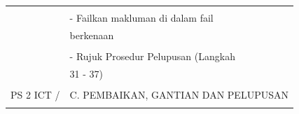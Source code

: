 \documentclass[
]{article}
\begin{document}
\begin{longtable}[]{@{}ll@{}}
\begin{minipage}[t]{0.71\columnwidth}
\strut
\end{minipage}\tabularnewline
\begin{minipage}[t]{0.23\columnwidth}\raggedright
\strut
\end{minipage} & \begin{minipage}[t]{0.71\columnwidth}\raggedright
- Failkan makluman di dalam fail\strut
\end{minipage}\tabularnewline
\begin{minipage}[t]{0.23\columnwidth}\raggedright
\strut
\end{minipage} & \begin{minipage}[t]{0.71\columnwidth}\raggedright
berkenaan\strut
\end{minipage}\tabularnewline
\begin{minipage}[t]{0.23\columnwidth}\raggedright
\strut
\end{minipage} & \begin{minipage}[t]{0.71\columnwidth}\raggedright
\strut
\end{minipage}\tabularnewline
\begin{minipage}[t]{0.23\columnwidth}\raggedright
\strut
\end{minipage} & \begin{minipage}[t]{0.71\columnwidth}\raggedright
- Rujuk Prosedur Pelupusan (Langkah\strut
\end{minipage}\tabularnewline
\begin{minipage}[t]{0.23\columnwidth}\raggedright
\strut
\end{minipage} & \begin{minipage}[t]{0.71\columnwidth}\raggedright
31 - 37)\strut
\end{minipage}\tabularnewline
\begin{minipage}[t]{0.23\columnwidth}\raggedright
\strut
\end{minipage} & \begin{minipage}[t]{0.71\columnwidth}\raggedright
\strut
\end{minipage}\tabularnewline
\begin{minipage}[t]{0.23\columnwidth}\raggedright
PS 2 ICT /\strut
\end{minipage} & \begin{minipage}[t]{0.71\columnwidth}\raggedright
C. PEMBAIKAN, GANTIAN DAN PELUPUSAN\strut
\end{minipage}\tabularnewline
\begin{minipage}[t]{0.23\columnwidth}\raggedright
\strut
\end{minipage} & \begin{minipage}[t]{0.71\columnwidth}\raggedright

\end{minipage}
\end{longtable}
\end{document}
